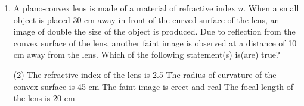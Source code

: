 
\begin{enumerate}
    \item A plano-convex lens is made of a material of refractive index \( n \). When a small object is placed 30 cm away in front of the curved surface of the lens, an image of double the size of the object is produced. Due to reflection from the convex surface of the lens, another faint image is observed at a distance of 10 cm away from the lens. Which of the following statement(s) is(are) true?
        \begin{tasks}(2)
            \task The refractive index of the lens is 2.5
            \task The radius of curvature of the convex surface is 45 cm
            \task The faint image is erect and real
            \task The focal length of the lens is 20 cm
        \end{tasks}
\end{enumerate}
